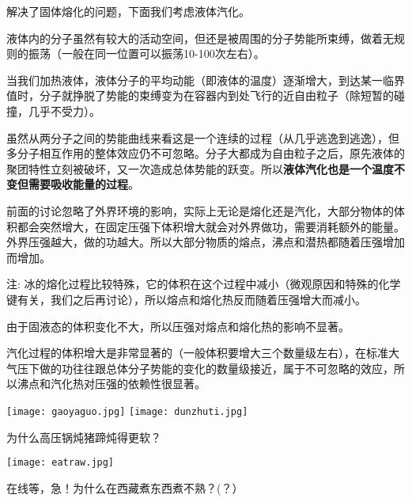 \documentclass[CJK]{beamer}
\begin{document}
\begin{frame}
\bch
解决了固体熔化的问题，下面我们考虑液体汽化。
\ech
\end{frame}

\begin{frame}
\bch
\bitem
\item{液体内的分子虽然有较大的活动空间，但还是被周围的分子势能所束缚，做着无规则的振荡（一般在同一位置可以振荡10-100次左右）。}
\item{当我们加热液体，液体分子的平均动能（即液体的温度）逐渐增大，到达某一临界值时，分子就挣脱了势能的束缚变为在容器内到处飞行的近自由粒子（除短暂的碰撞，几乎不受力）。}
\item{虽然从两分子之间的势能曲线来看这是一个连续的过程（从几乎逃逸到逃逸），但多分子相互作用的整体效应仍不可忽略。分子大都成为自由粒子之后，原先液体的聚团特性立刻被破坏，又一次造成总体势能的跃变。所以{\bf 液体汽化也是一个温度不变但需要吸收能量的过程}。}
\eitem
\ech
\end{frame}

\begin{frame}
\bch
\bitem
\item{前面的讨论忽略了外界环境的影响，实际上无论是熔化还是汽化，大部分物体的体积都会突然增大，在固定压强下体积增大就会对外界做功，需要消耗额外的能量。外界压强越大，做的功越大。所以大部分物质的熔点，沸点和潜热都随着压强增加而增加。

\scriptsize 注: 冰的熔化过程比较特殊，它的体积在这个过程中减小（微观原因和特殊的化学键有关，我们之后再讨论），所以熔点和熔化热反而随着压强增大而减小。}
\item{由于固液态的体积变化不大，所以压强对熔点和熔化热的影响不显著。}
\item{汽化过程的体积增大是非常显著的（一般体积要增大三个数量级左右），在标准大气压下做的功往往跟总体分子势能的变化的数量级接近，属于不可忽略的效应，所以沸点和汽化热对压强的依赖性很显著。}
\eitem
\ech
\end{frame}

\begin{frame}
\bch
\texttt{[image: gaoyaguo.jpg]}
\texttt{[image: dunzhuti.jpg]}

为什么高压锅炖猪蹄炖得更软？
\ech
\end{frame}


\begin{frame}
\bch
\texttt{[image: eatraw.jpg]}

在线等，急！为什么在西藏煮东西煮不熟？(？）
\ech
\end{frame}
\end{document}
